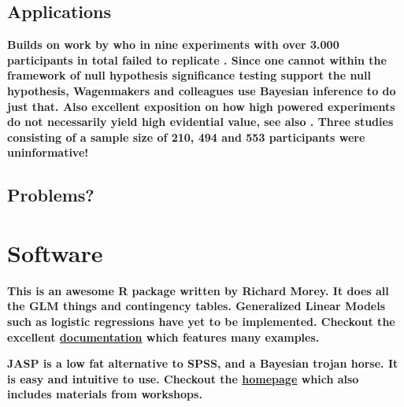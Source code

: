 \documentclass[12pt]{scrartcl}
\begin{document}
\subsection{Applications}
\begin{description}
  \item {}
  \item {}
  \item {}
  \item {}
  \item {}
  
  \textbf{Builds on work by \cite{donnellan2014association} who in nine experiments with over 3.000 participants in total failed to replicate \cite{bargh2012bath}. Since one cannot within the framework of null hypothesis significance testing support the null hypothesis, Wagenmakers and colleagues use Bayesian inference to do just that. Also excellent exposition on how high powered experiments do not necessarily yield high evidential value, see also \cite{wagenmakers2014power}. Three studies consisting of a sample size of 210, 494 and 553 participants were uninformative!}

  \item {}
\end{description}


\subsection{Problems?}
\begin{description}
  \item {}
  \item {}
  \item {}
\end{description}




\section{Software}
\begin{description}
  \item {}
  \item {}
  
  \textbf{This is an awesome R package written by Richard Morey. It does all the GLM things and contingency tables. Generalized Linear Models such as logistic regressions have yet to be implemented. Checkout the excellent \href{http://bayesfactorpcl.r-forge.r-project.org/}{documentation} which features many examples.}
  
  \item {}
  
  \textbf{JASP is a low fat alternative to SPSS, and a Bayesian trojan horse. It is easy and intuitive to use. Checkout the \href{https://jasp-stats.org/}{homepage} which also includes materials from workshops.}
\end{description}
\end{document}
